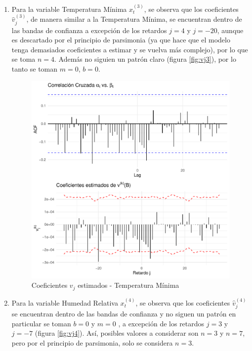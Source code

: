 \documentclass[12pt,oneside]{book}\usepackage[]{graphicx}\usepackage[]{color}
\makeatletter
\def\maxwidth{ %
  \ifdim\Gin@nat@width>\linewidth
    \linewidth
  \else
    \Gin@nat@width
  \fi
}
\newenvironment{knitrout}{}{} %
\theoremstyle{definition} %
\makeatother
\begin{document}
\begin{enumerate}
\item Para la variable Temperatura Mínima $x_t^{(3)}$, se observa que los coeficientes $\hat v_j^{(3)}$, de manera similar a la Temperatura Mínima, se encuentran dentro de las bandas de confianza a excepción de los retardos $j=4$ y $j=-20$, aunque es descartado por el principio de parsimonia (ya que hace que el modelo tenga demasiados coeficientes a estimar y se vuelva más complejo), por lo que se toma $n=4$. Además no siguien un patrón claro (figura \ref{fig:vj3}), por lo tanto se toman $m=0$, $b=0$. 


\begin{knitrout}
\color{fgcolor}\begin{figure}[H]

{\centering \includegraphics[width=\maxwidth]{figure/unnamed-chunk-43-1} 

}

\caption{\label{fig:vj3} Coeficientes $v_j$ estimados - Temperatura Mínima }\label{fig:unnamed-chunk-43}
\end{figure}


\end{knitrout}



\item Para la variable Humedad Relativa $x_t^{(4)}$, se observa que los coeficientes $\hat v_j^{(4)}$ se encuentran dentro de las bandas de confianza y no siguen un patrón en particular se toman $b=0$ y $m=0$ , a excepción de los retardos $j=3$ y $j=-7$ (figura \ref{fig:vj4}). Así, posibles valores a considerar son $n=3$ y $n=7$, pero por el principio de parsimonia, solo se considera $n=3$.




\end{enumerate}
\end{document}
